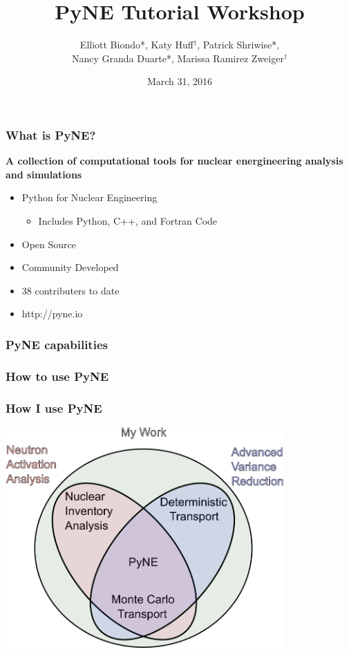 \documentclass[12pt]{beamer}
\begin{document}
\title{PyNE Tutorial Workshop}   
\author{Elliott Biondo*, Katy Huff$^\dagger$, Patrick Shriwise*, \\ Nancy Granda Duarte*, Marissa Ramirez Zweiger$^\dagger$}
\date{March 31, 2016}
\frame[plain]{\titlepage \addtocounter{framenumber}{-1}} 
\begin{frame}[fragile]
\frametitle{What is PyNE?}

{\bf A collection of computational tools for nuclear energineering analysis and simulations}

\begin{itemize}
\item Python for Nuclear Engineering
\begin{itemize}
\item Includes Python, C++, and Fortran Code
\end{itemize}
\item Open Source
\item Community Developed
\item 38 contributers to date
\item http://pyne.io
\end{itemize}

\end{frame}
\begin{frame}[fragile]
\frametitle{PyNE capabilities}

\end{frame}
\begin{frame}[fragile]
\frametitle{How to use PyNE}

\end{frame}
\begin{frame}[fragile]
\frametitle{How I use PyNE}
\centerline{\includegraphics[width=0.8\textwidth]{coupling.pdf}}
\end{frame}
\end{document}
